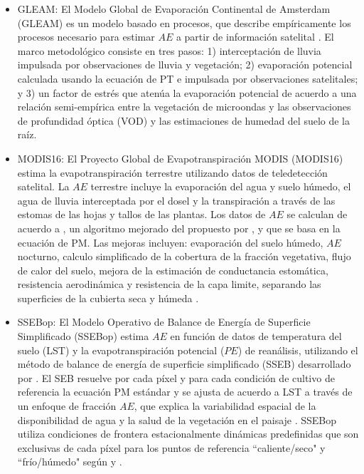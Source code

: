 \documentclass[12pt]{article}
\begin{document}
\begin{itemize}
	\item GLEAM: El Modelo Global de Evaporación Continental de Amsterdam (GLEAM) es un modelo basado en procesos, que describe empíricamente los procesos necesario para estimar $AE$ a partir de información satelital \citep{Martens2017}. El marco metodológico consiste en tres pasos: 1) interceptación de lluvia impulsada por observaciones de lluvia y vegetación; 2) evaporación potencial calculada usando la ecuación de PT e impulsada por observaciones satelitales; y 3) un factor de estrés que atenúa la evaporación potencial de acuerdo a una relación semi-empírica entre la vegetación de microondas y las observaciones de profundidad óptica (VOD) y las estimaciones de humedad del suelo de la raíz. %
	
	\item MODIS16: El Proyecto Global de Evapotranspiración MODIS (MODIS16) estima la evapotranspiración terrestre utilizando datos de teledetección satelital. La $AE$ terrestre incluye la evaporación del agua y suelo húmedo, el agua de lluvia interceptada por el dosel y la transpiración a través de las estomas de las hojas y tallos de las plantas. Los datos de $AE$ se calculan de acuerdo a \citet{mu2013modis}, un algoritmo mejorado del propuesto por \citet{mu2007development}, y que se basa en la ecuación de PM. Las mejoras incluyen: evaporación del suelo húmedo, $AE$ nocturno, calculo simplificado de la cobertura de la fracción vegetativa, flujo de calor del suelo, mejora de la estimación de conductancia estomática, resistencia aerodinámica y resistencia de la capa limite, separando las superficies de la cubierta seca y húmeda \citep{mu2013modis}.
	
	\item SSEBop: El Modelo Operativo de Balance de Energía de Superficie Simplificado (SSEBop) estima $AE$ en función de datos de temperatura del suelo (LST) y la evapotranspiración potencial ($PE$) de reanálisis, utilizando el método de balance de energía de superficie simplificado (SSEB) desarrollado por \citet{senay2007coupled,senay2011enhancing}. El SEB resuelve por cada píxel y para cada condición de cultivo de referencia la ecuación PM estándar y se ajusta de acuerdo a LST a través de un enfoque de fracción $AE$, que explica la variabilidad espacial de la disponibilidad de agua y la salud de la vegetación en el paisaje \citep{savoca2013actual}. SSEBop utiliza condiciones de frontera estacionalmente dinámicas predefinidas que son exclusivas de cada píxel para los puntos de referencia ``caliente/seco" y ``frío/húmedo" según \citet{bastiaanssen2014earth} y \citet{allen2007satellite}.
	

\end{itemize}
\end{document}
